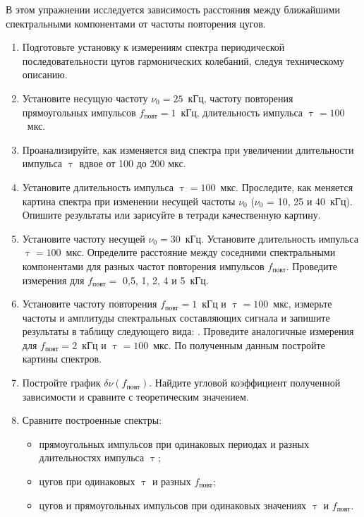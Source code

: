 \begin{lab:task}

В этом упражнении исследуется зависимость расстояния между ближайшими спектральными компонентами от частоты повторения цугов.

\begin{enumerate}
	\item Подготовьте установку к измерениям спектра периодической последовательности цугов гармонических колебаний, следуя техническому описанию. 
	\item Установите несущую частоту $\nu_0 = 25$~кГц, частоту повторения прямоугольных импульсов $f_\text{повт} = 1$~кГц, длительность импульса $\uptau = 100$~мкс.
	\item Проанализируйте, как изменяется вид спектра при увеличении длительности импульса $\uptau$ вдвое от 100 до 200 мкс.
	\item Установите длительность импульса $\uptau= 100$~мкс. Проследите, как меняется картина спектра при изменении несущей частоты $\nu_0$ ($\nu_0$ = 10, 25 и 40~кГц). Опишите результаты или зарисуйте в тетради качественную картину.
	\item Установите частоту несущей $\nu_0 = 30$~кГц. Установите длительность импульса $\uptau = 100$~мкс. Определите расстояние  между соседними спектральными компонентами для разных частот повторения импульсов $f_\text{повт}$. Проведите измерения для $f_\text{повт} =$ 0,5, 1, 2, 4 и 5~кГц.
	\item Установите частоту повторения $f_\text{повт} = 1$~кГц и $\uptau = 100$~мкс, измерьте частоты и амплитуды спектральных составляющих сигнала и запишите результаты в таблицу следующего вида: . Проведите аналогичные измерения для $f_\text{повт} = 2$~кГц и $\uptau = 100$~мкс. По полученным данным постройте картины спектров.
	\item Постройте график $\delta \nu(f_\text{повт})$. Найдите угловой коэффициент полученной зависимости и сравните с теоретическим значением.
	\item Сравните построенные спектры:
	\begin{itemize}
		\item прямоугольных импульсов при одинаковых периодах и разных длительностях импульса $\uptau$;
		\item цугов при одинаковых $\uptau$ и разных $f_\text{повт}$;
		\item цугов и прямоугольных импульсов при одинаковых значениях $\uptau$ и  $f_\text{повт}$.
	\end{itemize}
\end{enumerate}


\end{lab:task}
